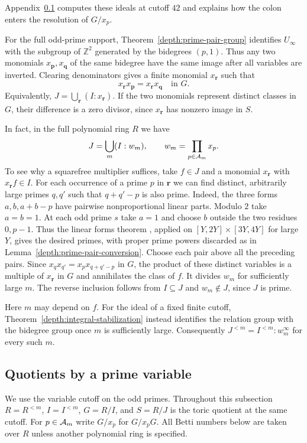 Appendix~\ref{depth:prime-variable} computes these ideals at cutoff $42$
and explains how the colon enters the resolution of $G/x_p$.

For the full odd-prime support, Theorem~\ref{depth:prime-pair-group}
identifies $U_\infty$ with the subgroup of $\mathbb Z^2$
generated by the bidegrees $(p,1)$. Thus any two monomials
$x_{\boldsymbol p},x_{\boldsymbol q}$ of the same bidegree have the same
image after all variables are inverted. Clearing denominators gives a
finite monomial $x_{\boldsymbol r}$ such that
\[
 x_{\boldsymbol r}x_{\boldsymbol p}
     =x_{\boldsymbol r}x_{\boldsymbol q}\quad\text{in }G .
\]
Equivalently, $J=\bigcup_{\boldsymbol r}(I:x_{\boldsymbol r})$.
If the two monomials represent distinct classes in $G$, their
difference is a zero divisor, since $x_{\boldsymbol r}$ has nonzero
image in $S$.

In fact, in the full polynomial ring $R$ we have
\[
 J=\bigcup_m(I:w_m),\qquad w_m=\prod_{p\in\mathcal A_m}x_p .
\]
To see why a squarefree multiplier suffices, take $f\in J$ and a
monomial $x_{\boldsymbol r}$ with $x_{\boldsymbol r}f\in I$. For each
occurrence of a prime $p$ in $\boldsymbol r$ we can find distinct,
arbitrarily large primes $q,q'$ such that $q+q'-p$ is also prime.
Indeed, the three forms $a,b,a+b-p$ have pairwise nonproportional
linear parts. Modulo $2$ take $a=b=1$. At each odd prime $s$ take
$a=1$ and choose $b$ outside the two residues $0,p-1$. Thus the
linear forms theorem \cite[Theorem~1.6]{TT}, applied on
$[Y,2Y]\times[3Y,4Y]$ for large $Y$, gives the desired primes, with proper prime
powers discarded as in Lemma~\ref{depth:prime-pair-conversion}.
Choose each pair above all the preceding pairs. Since
$x_qx_{q'}=x_px_{q+q'-p}$ in $G$, the product of these distinct
variables is a multiple of $x_{\boldsymbol r}$ in $G$ and annihilates
the class of $f$. It divides $w_m$ for sufficiently large $m$. The
reverse inclusion follows from $I\subseteq J$ and $w_m\notin J$,
since $J$ is prime.

Here $m$ may depend on $f$. For the ideal of a fixed finite cutoff,
Theorem~\ref{depth:integral-stabilization} instead identifies the
relation group with the bidegree group once $m$ is sufficiently large.
Consequently $J^{<m}=I^{<m}:w_m^\infty$ for every such $m$.

\subsection{Quotients by a prime variable}\label{depth:prime-variable}
We use the variable cutoff on the odd primes. Throughout this
subsection $R=R^{<m}$, $I=I^{<m}$, $G=R/I$, and $S=R/J$ is the toric
quotient at the same cutoff. For $p\in\mathcal A_m$ write $G/x_p$ for
$G/x_pG$. All Betti numbers below are taken over $R$ unless another
polynomial ring is specified.

